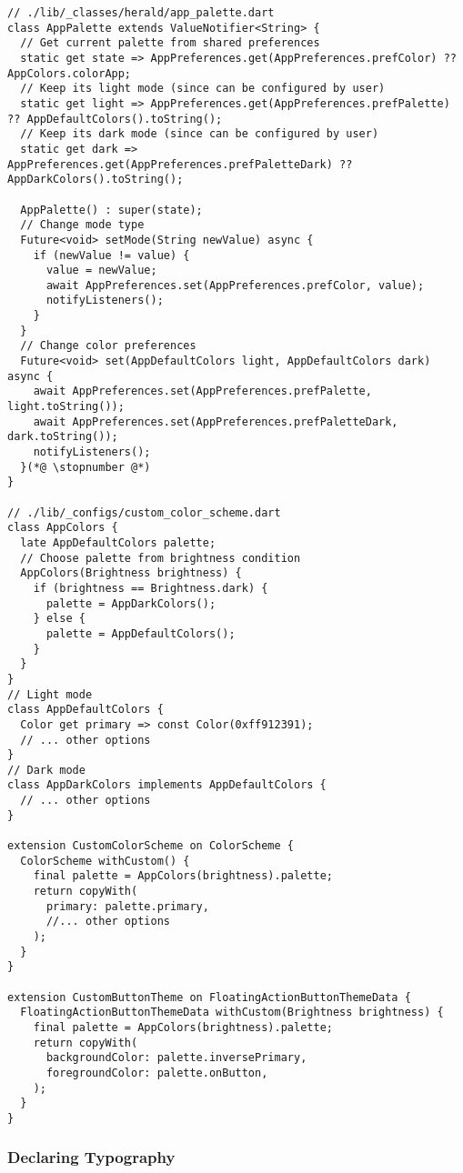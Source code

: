 \begin{lstlisting}
// ./lib/_classes/herald/app_palette.dart
class AppPalette extends ValueNotifier<String> {
  // Get current palette from shared preferences
  static get state => AppPreferences.get(AppPreferences.prefColor) ?? AppColors.colorApp;
  // Keep its light mode (since can be configured by user)
  static get light => AppPreferences.get(AppPreferences.prefPalette) ?? AppDefaultColors().toString();
  // Keep its dark mode (since can be configured by user)
  static get dark => AppPreferences.get(AppPreferences.prefPaletteDark) ?? AppDarkColors().toString();

  AppPalette() : super(state);
  // Change mode type
  Future<void> setMode(String newValue) async {
    if (newValue != value) {
      value = newValue;
      await AppPreferences.set(AppPreferences.prefColor, value);
      notifyListeners();
    }
  }
  // Change color preferences
  Future<void> set(AppDefaultColors light, AppDefaultColors dark) async {
    await AppPreferences.set(AppPreferences.prefPalette, light.toString());
    await AppPreferences.set(AppPreferences.prefPaletteDark, dark.toString());
    notifyListeners();
  }(*@ \stopnumber @*)
}

// ./lib/_configs/custom_color_scheme.dart
class AppColors {
  late AppDefaultColors palette;
  // Choose palette from brightness condition
  AppColors(Brightness brightness) {
    if (brightness == Brightness.dark) {
      palette = AppDarkColors();
    } else {
      palette = AppDefaultColors();
    }
  }
}
// Light mode
class AppDefaultColors {
  Color get primary => const Color(0xff912391);
  // ... other options
}
// Dark mode
class AppDarkColors implements AppDefaultColors {
  // ... other options
}

extension CustomColorScheme on ColorScheme {
  ColorScheme withCustom() {
    final palette = AppColors(brightness).palette;
    return copyWith(
      primary: palette.primary,
      //... other options
    );
  }
}

extension CustomButtonTheme on FloatingActionButtonThemeData {
  FloatingActionButtonThemeData withCustom(Brightness brightness) {
    final palette = AppColors(brightness).palette;
    return copyWith(
      backgroundColor: palette.inversePrimary,
      foregroundColor: palette.onButton,
    );
  }
}
\end{lstlisting}


\subsubsection{Declaring Typography}

